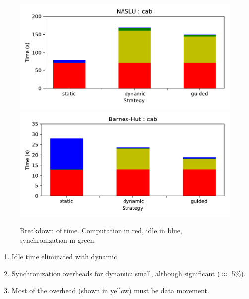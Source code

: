 \begin{frame}[label=execTimings]
\begin{figure}[ht!]
\label{fig:dmTimes-cab}
\begin{center}
\includegraphics[scale=0.35]{./plots/dmTime-NASLU-cab}
\includegraphics[scale=0.35]{./plots/dmTime-nbody-cab}
\end{center}
\caption{\label{fig:dmTimes-cab} \tiny Breakdown of time. Computation in red, idle in blue, synchronization in green.}
\end{figure}
\begin{enumerate}
\small \item \small Idle time eliminated with dynamic
\small \item \small Synchronization overheads for dynamic: small,
although significant ($\approx$ 5\%).
\item \small Most of the overhead (shown in yellow) must be data movement.
\end{enumerate}
\end{frame}

